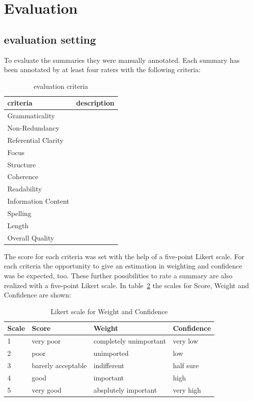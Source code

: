 
\section{Evaluation}
\label{ch:evaluation}

\subsection{evaluation setting}
To evaluate the summaries they were manually annotated.
Each summary has been annotated by at least four raters with the following criteria:
\begin{table}[H]
	\begin{tabularx}{\textwidth}{l|X} \toprule
		criteria & description \\ \midrule
		Grammaticality      & \\
		Non-Redundancy      & \\
		Referential Clarity & \\
		Focus               & \\
		Structure           & \\
		Coherence           & \\
		Readability         & \\
		Information Content & \\
		Spelling            & \\
		Length              & \\
		Overall Quality     & \\ \bottomrule
	\end{tabularx}
	\caption{evaluation criteria}
	\label{tab:evacriteria}
\end{table}

The score for each criteria was set with the help of a five-point Likert scale.
For each criteria the opportunity to give an estimation in weighting and confidence was be expected, too. These further possibilities to rate a summary are also realized with a five-point Likert scale.
In table~\ref{tab:evalikert} the scales for Score, Weight and Confidence are shown:

\begin{table}[H]
	\begin{tabularx}{\textwidth}{l|XXX} \toprule
		Scale & Score & Weight & Confidence \\ \midrule
		1 & very poor & completely unimportant & very low \\
		2 & poor & unimported & low \\
		3 & barerly acceptable & indifferent & half sure \\
		4 & good & important & high \\
		5 & very good & absplutely important & very high \\ \bottomrule    
	\end{tabularx}
	\caption{Likert scale for Weight and Confidence}
	\label{tab:evalikert}
\end{table}

